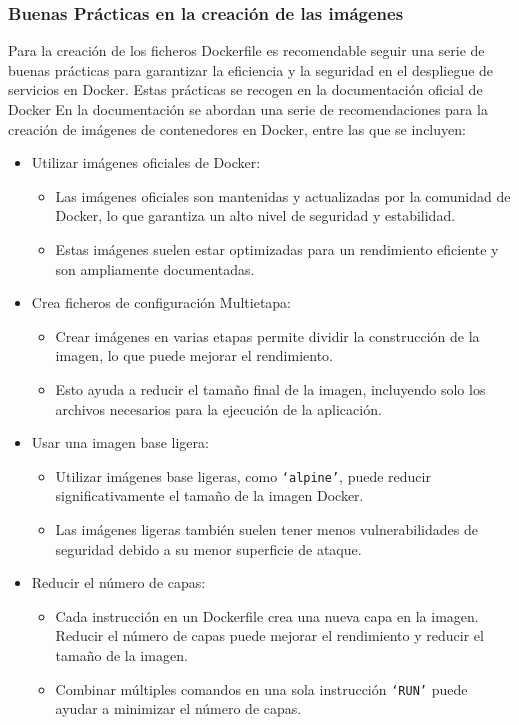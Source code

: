 \documentclass[12pt, a4paper, twoside]{article}
\begin{document}
\subsubsection{Buenas Prácticas en la creación de las imágenes}
Para la creación de los ficheros Dockerfile es recomendable seguir una serie de buenas prácticas para garantizar la eficiencia y la seguridad en el despliegue de servicios en Docker.
Estas prácticas se recogen en la documentación oficial de Docker \cite{Dockerfile_best_practices}
En la documentación se abordan una serie de recomendaciones para la creación de imágenes de contenedores en Docker, entre las que se incluyen:
\begin{itemize}
    \item Utilizar imágenes oficiales de Docker:
    \begin{itemize}
        \item Las imágenes oficiales son mantenidas y actualizadas por la comunidad de Docker, lo que garantiza un alto nivel de seguridad y estabilidad.
        \item Estas imágenes suelen estar optimizadas para un rendimiento eficiente y son ampliamente documentadas.
    \end{itemize}
    
    \item Crea ficheros de configuración Multietapa:
    \begin{itemize}
        \item Crear imágenes en varias etapas permite dividir la construcción de la imagen, lo que puede mejorar el rendimiento.
        \item Esto ayuda a reducir el tamaño final de la imagen, incluyendo solo los archivos necesarios para la ejecución de la aplicación.
    \end{itemize}
    
    \item Usar una imagen base ligera:
    \begin{itemize}
        \item Utilizar imágenes base ligeras, como \texttt{`alpine'}, puede reducir significativamente el tamaño de la imagen Docker.
        \item Las imágenes ligeras también suelen tener menos vulnerabilidades de seguridad debido a su menor superficie de ataque.
    \end{itemize}
    
    \item Reducir el número de capas:
    \begin{itemize}
        \item Cada instrucción en un Dockerfile crea una nueva capa en la imagen. Reducir el número de capas puede mejorar el rendimiento y reducir el tamaño de la imagen.
        \item Combinar múltiples comandos en una sola instrucción \texttt{`RUN'} puede ayudar a minimizar el número de capas.
    \end{itemize}
    

\end{itemize}
\end{document}
